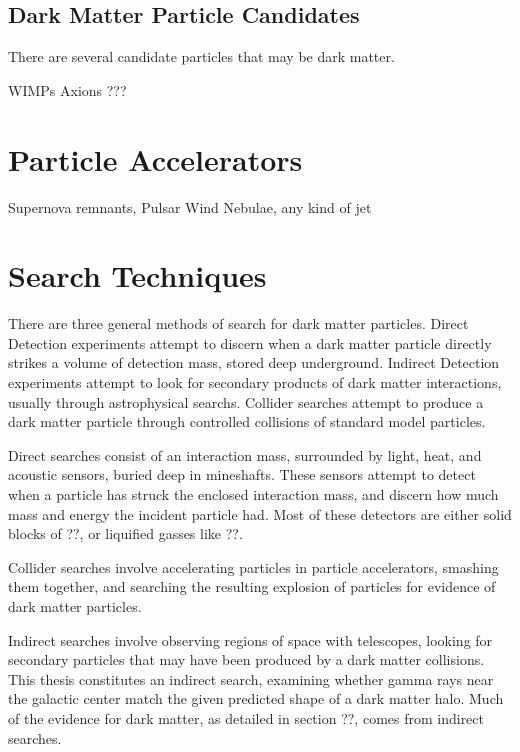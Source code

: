 \subsection{Dark Matter Particle Candidates}

There are several candidate particles that may be dark matter.

WIMPs
Axions
???

\section{Particle Accelerators}

Supernova remnants, Pulsar Wind Nebulae, any kind of jet


\section{Search Techniques}


There are three general methods of search for dark matter particles.
Direct Detection experiments attempt to discern when a dark matter particle directly strikes a volume of detection mass, stored deep underground.
Indirect Detection experiments attempt to look for secondary products of dark matter interactions, usually through astrophysical searchs.
Collider searches attempt to produce a dark matter particle through controlled collisions of standard model particles.

Direct searches consist of an interaction mass, surrounded by light, heat, and acoustic sensors, buried deep in mineshafts.
These sensors attempt to detect when a particle has struck the enclosed interaction mass, and discern how much mass and energy the incident particle had.
Most of these detectors are either solid blocks of ??, or liquified gasses like ??.

Collider searches involve accelerating particles in particle accelerators, smashing them together, and searching the resulting explosion of particles for evidence of dark matter particles.

Indirect searches involve observing regions of space with telescopes, looking for secondary particles that may have been produced by a dark matter collisions.
This thesis constitutes an indirect search, examining whether gamma rays near the galactic center match the given predicted shape of a dark matter halo.
Much of the evidence for dark matter, as detailed in section ??, comes from indirect searches.



